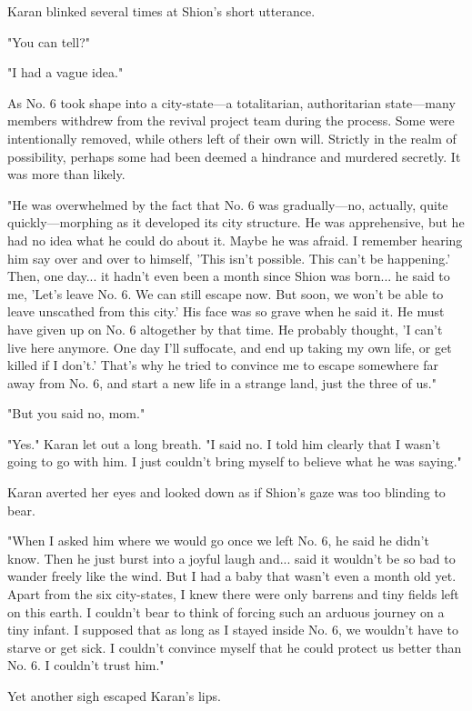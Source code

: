 Karan blinked several times at Shion's short utterance.

"You can tell?"

"I had a vague idea."

As No. 6 took shape into a city-state---a totalitarian, authoritarian
state---many members withdrew from the revival project team during the
process. Some were intentionally removed, while others left of their own
will. Strictly in the realm of possibility, perhaps some had been deemed
a hindrance and murdered secretly. It was more than likely.

"He was overwhelmed by the fact that No. 6 was gradually---no, actually,
quite quickly---morphing as it developed its city structure. He was
apprehensive, but he had no idea what he could do about it. Maybe he was
afraid. I remember hearing him say over and over to himself, 'This isn't
possible. This can't be happening.' Then, one day... it hadn't even been
a month since Shion was born... he said to me, 'Let's leave No. 6. We
can still escape now. But soon, we won't be able to leave unscathed from
this city.' His face was so grave when he said it. He must have given up
on No. 6 altogether by that time. He probably thought, 'I can't live
here anymore. One day I'll suffocate, and end up taking my own life, or
get killed if I don't.' That's why he tried to convince me to escape
somewhere far away from No. 6, and start a new life in a strange land,
just the three of us."

"But you said no, mom."

"Yes." Karan let out a long breath. "I said no. I told him clearly that
I wasn't going to go with him. I just couldn't bring myself to believe
what he was saying."

Karan averted her eyes and looked down as if Shion's gaze was too
blinding to bear.

"When I asked him where we would go once we left No. 6, he said he
didn't know. Then he just burst into a joyful laugh and... said it
wouldn't be so bad to wander freely like the wind. But I had a baby that
wasn't even a month old yet. Apart from the six city-states, I knew
there were only barrens and tiny fields left on this earth. I couldn't
bear to think of forcing such an arduous journey on a tiny infant. I
supposed that as long as I stayed inside No. 6, we wouldn't have to
starve or get sick. I couldn't convince myself that he could protect us
better than No. 6. I couldn't trust him."

Yet another sigh escaped Karan's lips.

